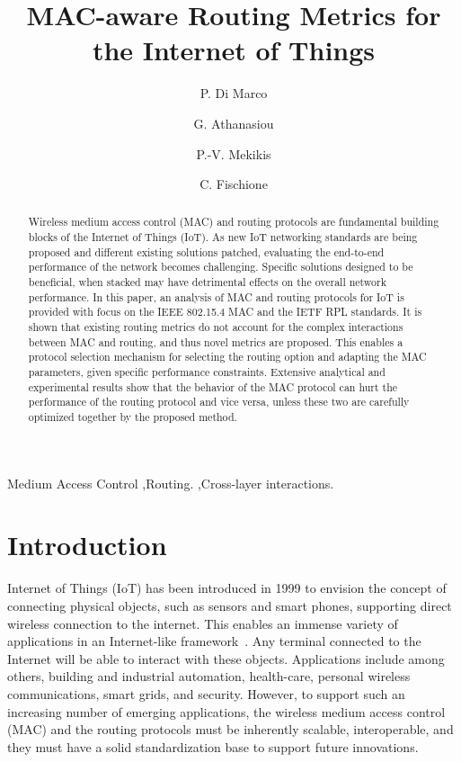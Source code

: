 \documentclass[review, 1p, 11pt]{elsarticle}
\numberwithin{equation}{section}
\begin{document}
\begin{frontmatter}

\title{MAC-aware Routing Metrics for the Internet of Things}
\author[kth]{P. Di Marco}
\author[kth]{G. Athanasiou}
\author[upc]{P.-V. Mekikis}
\author[kth]{C. Fischione}
\address[kth]{ACCESS Linnaeus Centre, School of Electrical Engineering, KTH, Stockholm, Sweden}
\address[upc]{Signal Theory and Comm. Dept., Technical University of Catalonia, Barcelona, Spain}



\begin{abstract}

Wireless medium access control (MAC) and routing protocols are
fundamental building blocks of the Internet of
Things (IoT). As new IoT networking standards are being proposed and different
existing solutions patched, evaluating the end-to-end performance of the
network becomes challenging. Specific solutions designed to be
beneficial, when stacked may have detrimental effects on the
overall network performance. In this paper, an analysis of MAC and routing protocols for IoT is provided with focus
 on the IEEE 802.15.4 MAC and the IETF RPL standards. It is shown that existing routing metrics do not
account for the complex interactions between MAC and routing, and thus novel metrics are proposed.
This enables a protocol selection mechanism  for selecting the routing option and adapting the MAC parameters,
given specific performance constraints. Extensive analytical and experimental results show that the behavior of the
MAC protocol can hurt the performance of the routing protocol and vice versa, unless these two are carefully
optimized together by the proposed method.
\end{abstract}
\begin{keyword}
Medium Access Control \sep Routing. \sep Cross-layer interactions.
\end{keyword}
\end{frontmatter}

\section{Introduction}

 Internet of Things (IoT) has been introduced in 1999 to
envision the concept of connecting physical
objects, such as sensors and smart phones, supporting direct wireless connection to
the internet. This enables an immense variety of applications in an Internet-like framework~\cite{Atzori}.
Any terminal connected to the Internet will be able to interact with these
objects. Applications include among others, building and industrial automation,
health-care, personal wireless communications, smart grids, and
security. However, to support such an increasing
number of emerging applications, the wireless medium access
control (MAC) and the routing protocols must be inherently scalable,
interoperable, and they must have a solid standardization base to support
future innovations.
\end{document}

